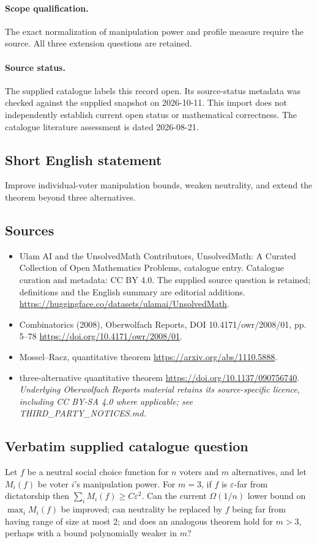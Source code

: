 \documentclass[11pt]{article}
\begin{document}
\paragraph{Scope qualification.}
The exact normalization of manipulation power and profile measure require the source. All three extension questions are retained.
\paragraph{Source status.}
The supplied catalogue labels this record open. Its source-status metadata was checked against the supplied snapshot on 2026-10-11. This import does not independently establish current open status or mathematical correctness. The catalogue literature assessment is dated 2026-08-21.
\subsection{Short English statement}
Improve individual-voter manipulation bounds, weaken neutrality, and extend the theorem beyond three alternatives.
\subsection{Sources}
\begin{itemize}
\item[S1] Ulam AI and the UnsolvedMath Contributors, UnsolvedMath: A Curated Collection of Open Mathematics Problems, catalogue entry. Catalogue curation and metadata: CC BY 4.0. The supplied source question is retained; definitions and the English summary are editorial additions.
\url{https://huggingface.co/datasets/ulamai/UnsolvedMath}.
\item[S2] Combinatorics (2008), Oberwolfach Reports, DOI 10.4171/owr/2008/01, pp. 5--78
\url{https://doi.org/10.4171/owr/2008/01}.
\item[S3] Mossel--Racz, quantitative theorem
\url{https://arxiv.org/abs/1110.5888}.
\item[S4] three-alternative quantitative theorem
\url{https://doi.org/10.1137/090756740}.
\textit{Underlying Oberwolfach Reports material retains its source-specific licence, including CC BY-SA 4.0 where applicable; see THIRD\_PARTY\_NOTICES.md.}
\end{itemize}
\subsection{Verbatim supplied catalogue question}
Let $f$ be a neutral social choice function for $n$ voters and $m$ alternatives, and let $M_i(f)$ be voter $i$'s manipulation power. For $m=3$, if $f$ is $\varepsilon$-far from dictatorship then $\sum_iM_i(f)\geq C\varepsilon^2$. Can the current $\Omega(1/n)$ lower bound on $\max_iM_i(f)$ be improved; can neutrality be replaced by $f$ being far from having range of size at most 2; and does an analogous theorem hold for $m>3$, perhaps with a bound polynomially weaker in $m$?
\end{document}
